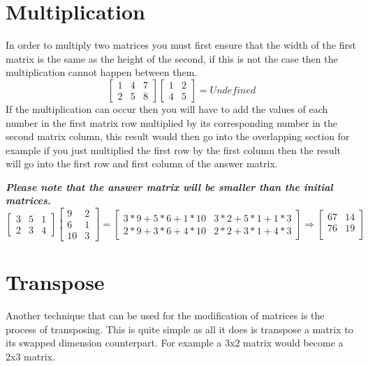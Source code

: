 \documentclass{article}
\begin{document}
\section{Multiplication}
In order to multiply two matrices you must first ensure that the width of the first matrix is the same as the height of the second, if this is not the case then the multiplication cannot happen between them.
\begin{equation*}
	\left[
		\begin{matrix}
			1 & 4 & 7\\
			2 & 5 & 8
			\end{matrix}
	\right]
	\left[
		\begin{matrix}
			1 & 2\\
			4 & 5
		\end{matrix}
	\right]
	=
	Undefined
\end{equation*}
If the multiplication can occur then you will have to add the values of each number in the first matrix row multiplied by its corresponding number in the second matrix column, this result would then go into the overlapping section for example if you just multiplied the first row by the first column then the result will go into the first row and first column of the answer matrix.

\textit{\textbf{Please note that the answer matrix will be smaller than the initial matrices.}}
\begin{equation*}
	\left[
		\begin{matrix}
			3 & 5 & 1\\
			2 & 3 & 4
			\end{matrix}
	\right]
	\left[
		\begin{matrix}
			9 & 2\\
			6 & 1\\
			10 & 3
		\end{matrix}
	\right]
	=
	\left[
		\begin{matrix}
			3*9+5*6+1*10 & 3*2+5*1+1*3\\
			2*9+3*6+4*10 & 2*2+3*1+4*3
		\end{matrix}
	\right]
	\Rightarrow
	\left[
		\begin{matrix}
			67 & 14\\
			76 & 19\\
		\end{matrix}
	\right]
\end{equation*}
\section{Transpose}
Another technique that can be used for the modification of matrices is the process of transposing. This is quite simple as all it does is transpose a matrix to its swapped dimension counterpart. For example a 3x2 matrix would become a 2x3 matrix.
\end{document}
